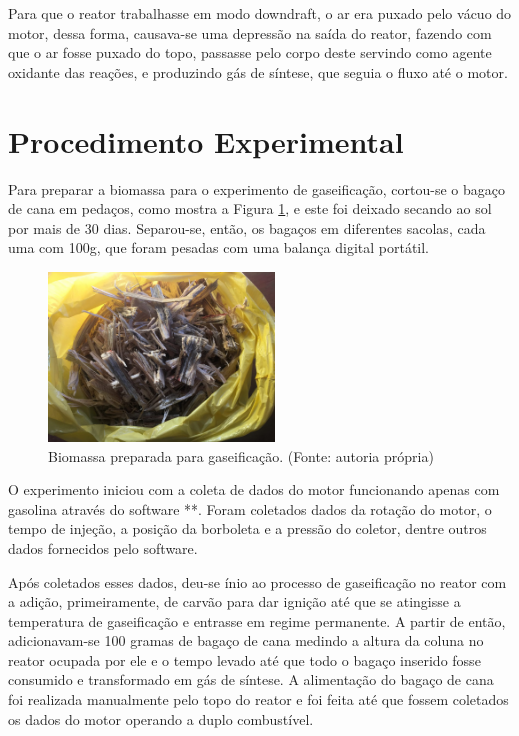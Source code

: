 Para que o reator trabalhasse em modo downdraft, o ar era puxado pelo vácuo do motor, dessa forma, causava-se uma depressão na saída do reator, fazendo com que o ar fosse puxado do topo, passasse pelo corpo deste servindo como agente oxidante das reações, e produzindo gás de síntese, que seguia o fluxo até o motor.

\section{Procedimento Experimental}

Para preparar a biomassa para o experimento de gaseificação, cortou-se o bagaço de cana em pedaços, como mostra a Figura \ref{bagaco_cortado}, e este foi deixado secando ao sol por mais de 30 dias. Separou-se, então, os bagaços em diferentes sacolas, cada uma com 100g, que foram pesadas com uma balança digital portátil.

\begin{figure}[!htb]
	\centering
	\includegraphics[width=6cm]{bagaco_cortado}
	\caption{Biomassa preparada para gaseificação. (Fonte: autoria própria)}
	\label{bagaco_cortado}
\end{figure}

O experimento iniciou com a coleta de dados do motor funcionando apenas com gasolina através do software **. Foram coletados dados da rotação do motor, o tempo de injeção, a posição da borboleta e a pressão do coletor, dentre outros dados fornecidos pelo software.

Após coletados esses dados, deu-se ínio ao processo de gaseificação no reator com a adição, primeiramente, de carvão para dar ignição até que se atingisse a temperatura de gaseificação e entrasse em regime permanente.
A partir de então, adicionavam-se 100 gramas de bagaço de cana medindo a altura da coluna no reator ocupada por ele e o tempo levado até que todo o bagaço inserido fosse consumido e transformado em gás de síntese. A alimentação do bagaço de cana foi realizada manualmente pelo topo do reator e foi feita até que fossem coletados os dados do motor operando a duplo combustível.

